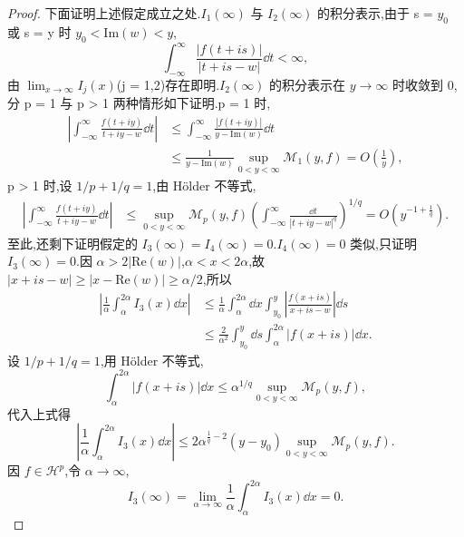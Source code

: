 \begin{proof}
下面证明上述假定成立之处.$I_{1}(\infty)$ 与 $I_{2}(\infty)$ 的积分表示,由于 s = $y_{0}$ 或 s = y 时 $y_{0} < \mathrm{Im}(w) < y$,
\begin{equation*}
\int_{-\infty}^{\infty}\frac{|f(t + is)|}{|t + is - w|}\dd t < \infty,
\end{equation*}
由 $\lim_{x \to \infty}I_{j}(x)$(j = 1,2)存在即明.$I_{2}(\infty)$ 的积分表示在 $y \to \infty$ 时收敛到 0,分 p = 1 与 p > 1 两种情形如下证明.p = 1 时,
\begin{align*}
\left| \int_{-\infty}^{\infty}\frac{f(t + iy)}{t + iy - w}\dd t \right| & \leq \int_{-\infty}^{\infty}\frac{|f(t + iy)|}{y - \mathrm{Im}(w)}\dd t \\
& \leq \frac{1}{y - \mathrm{Im}(w)}\sup_{0 < y < \infty}\mathcal{M}_{1}(y, f) = O\left(\frac{1}{y}\right),
\end{align*}
p > 1 时,设 $1/p + 1/q = 1$,由 Hölder 不等式,
\begin{align*}
\left| \int_{-\infty}^{\infty}\frac{f(t + iy)}{t + iy - w}\dd t \right|&\leq \sup_{0 < y < \infty}\mathcal{M}_{p}(y, f)\left(\int_{-\infty}^{\infty}\frac{\dd t}{|t + iy - w|^{q}}\right)^{1/q} = O(y^{-1 + \frac{1}{q}}).
 \end{align*}
至此,还剩下证明假定的 $I_{3}(\infty) = I_{4}(\infty) = 0$.$I_{4}(\infty) = 0$ 类似,只证明 $I_{3}(\infty) = 0$.因 $\alpha > 2|\mathrm{Re}(w)|$,$\alpha < x < 2\alpha$,故 $|x + is - w| \geq |x - \mathrm{Re}(w)| \geq \alpha/2$,所以
\begin{align*}
\left| \frac{1}{\alpha}\int_{\alpha}^{2\alpha}I_{3}(x)\dd x \right| & \leq \frac{1}{\alpha}\int_{\alpha}^{2\alpha}\dd x\int_{y_{0}}^{y}\left| \frac{f(x + is)}{x + is - w} \right|\dd s \\
& \leq \frac{2}{\alpha^{2}}\int_{y_{0}}^{y}\dd s\int_{\alpha}^{2\alpha}|f(x + is)|\dd x.
\end{align*}
设 $1/p + 1/q = 1$,用 Hölder 不等式,
\begin{equation*}
\int_{\alpha}^{2\alpha}|f(x + is)|\dd x \leq \alpha^{1/q}\sup_{0 < y < \infty}\mathcal{M}_{p}(y, f),
\end{equation*}
代入上式得
\begin{equation*}
\left| \frac{1}{\alpha}\int_{\alpha}^{2\alpha}I_{3}(x)\dd x \right| \leq 2\alpha^{\frac{1}{q} - 2}(y - y_{0})\sup_{0 < y < \infty}\mathcal{M}_{p}(y, f).
\end{equation*}
因 $f \in \mathcal{H}^{p}$,令 $\alpha \to \infty$,
\begin{equation*}
I_{3}(\infty) = \lim_{\alpha \to \infty}\frac{1}{\alpha}\int_{\alpha}^{2\alpha}I_{3}(x)\dd x = 0.
\end{equation*}


\end{proof}
